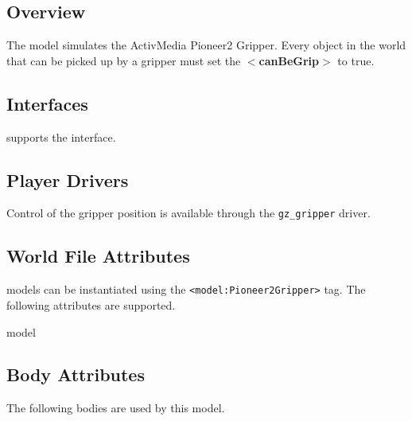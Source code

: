 
\subsection{Overview}

The {\tt \modelName} model simulates the ActivMedia Pioneer2 Gripper. Every object in the world that can be picked up by a gripper must set the {\bf $<$canBeGrip$>$} to true.

\subsection{\libgazebo Interfaces}

{\tt \modelName} supports the  interface.


\subsection{Player Drivers}

Control of the gripper position is available through the
{\tt gz\_gripper} driver.


\subsection{World File Attributes}

{\tt \modelName} models can be instantiated using the
\verb+<model:Pioneer2Gripper>+ tag.  The following attributes are
supported.

\begin{xmlattrtable}{model}{\modelName}
\modeldefaults
\end{xmlattrtable}

\subsection{Body Attributes}

The following bodies are used by this model.

\begin{bodyattrtable}
\bodydefaults
\end{bodyattrtable}

